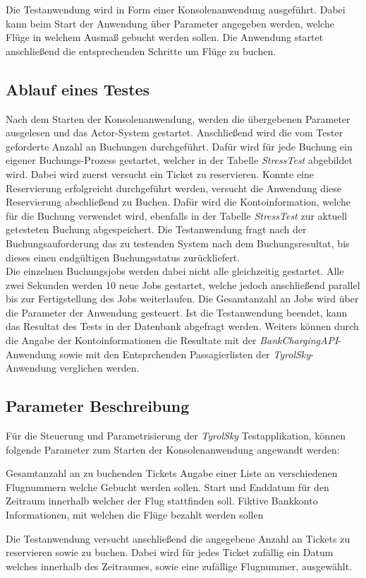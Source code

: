 Die Testanwendung wird in Form einer Konsolenanwendung ausgeführt. Dabei kann beim Start der Anwendung über Parameter angegeben werden, welche Flüge in welchem Ausmaß gebucht werden sollen. Die Anwendung startet anschließend die entsprechenden Schritte um Flüge zu buchen. 

\subsection{Ablauf eines Testes}
Nach dem Starten der Konsolenanwendung, werden die übergebenen Parameter ausgelesen und das Actor-System gestartet. Anschließend wird die vom Tester geforderte Anzahl an Buchungen durchgeführt. Dafür wird für jede Buchung ein eigener Buchungs-Prozess gestartet, welcher in der Tabelle \textit{StressTest} abgebildet wird. Dabei wird zuerst versucht ein Ticket zu reservieren. Konnte eine Reservierung erfolgreicht durchgeführt werden, versucht die Anwendung diese Reservierung abschließend zu Buchen. Dafür wird die Kontoinformation, welche für die Buchung verwendet wird, ebenfalls in der Tabelle \textit{StressTest} zur aktuell getesteten Buchung abgespeichert. Die Testanwendung fragt nach der Buchungsauforderung das zu testenden System nach dem Buchungsresultat, bis dieses einen endgültigen Buchungsstatus zurückliefert. \\
Die einzelnen Buchungsjobs werden dabei nicht alle gleichzeitig gestartet. Alle zwei Sekunden werden 10 neue Jobs gestartet, welche jedoch anschließend parallel bis zur Fertigstellung des Jobs weiterlaufen. Die Gesamtanzahl an Jobs wird über die Parameter der Anwendung gesteuert. Ist die Testanwendung beendet, kann das Resultat des Tests in der Datenbank abgefragt werden. Weiters können durch die Angabe der Kontoinformationen die Resultate mit der \textit{BankChargingAPI}-Anwendung sowie mit den Entsprchenden Passagierlisten der \textit{TyrolSky}-Anwendung verglichen werden.

\subsection{Parameter Beschreibung}
Für die Steuerung und Parametrisierung der \textit{TyrolSky} Testapplikation, können folgende Parameter zum Starten der Konsolenanwendung angewandt werden:

\begin{itemize}
     Gesamtanzahl an zu buchenden Tickets
     Angabe einer Liste an verschiedenen Flugnummern welche Gebucht werden sollen.
     Start und Enddatum für den Zeitraum innerhalb welcher der Flug stattfinden soll.
     Fiktive Bankkonto Informationen, mit welchen die Flüge bezahlt werden sollen
\end{itemize}
Die Testanwendung versucht anschließend die angegebene Anzahl an Tickets zu reservieren sowie zu buchen. Dabei wird für jedes Ticket zufällig ein Datum welches innerhalb des Zeitraumes, sowie eine zufällige Flugnummer, ausgewählt. 
